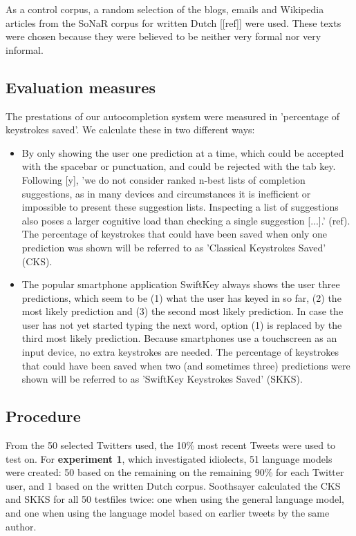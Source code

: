 \documentclass[11pt]{article}
\begin{document}
As a control corpus, a random selection of the blogs, emails and Wikipedia articles from the SoNaR corpus for written Dutch [[ref]] were used. These texts were chosen because they were believed to be neither very formal nor very informal.


\subsection{Evaluation measures}
The prestations of our autocompletion system were measured in 'percentage of keystrokes saved'. We calculate these in two different ways:
\begin{itemize}
\item By only showing the user one prediction at a time, which could be accepted with the spacebar or punctuation, and could be rejected with the tab key. Following [y], 'we do not consider ranked n-best lists of completion suggestions, as in many devices and circumstances it is inefficient or impossible to present these suggestion lists. Inspecting a list of suggestions also poses a larger cognitive load than checking a single suggestion [...].' (ref). The percentage of keystrokes that could have been saved when only one prediction was shown will be referred to as 'Classical Keystrokes Saved' (CKS).
\item The popular smartphone application SwiftKey always shows the user three predictions, which seem to be (1) what the user has keyed in so far, (2) the most likely prediction and (3) the second most likely prediction. In case the user has not yet started typing the next word, option (1) is replaced by the third most likely prediction. Because smartphones use a touchscreen as an input device, no extra keystrokes are needed. The percentage of keystrokes that could have been saved when two (and sometimes three) predictions were shown will be referred to as 'SwiftKey Keystrokes Saved' (SKKS).
\end{itemize}

\subsection{Procedure}
From the 50 selected Twitters used, the 10\% most recent Tweets were used to test on. For \textbf{experiment 1}, which investigated idiolects, 51 language models were created: 50 based on the remaining on the remaining 90\% for each Twitter user, and 1 based on the written Dutch corpus. Soothsayer calculated the CKS and SKKS for all 50 testfiles twice: one when using the general language model, and one when using the language model based on earlier tweets by the same author.
\end{document}
